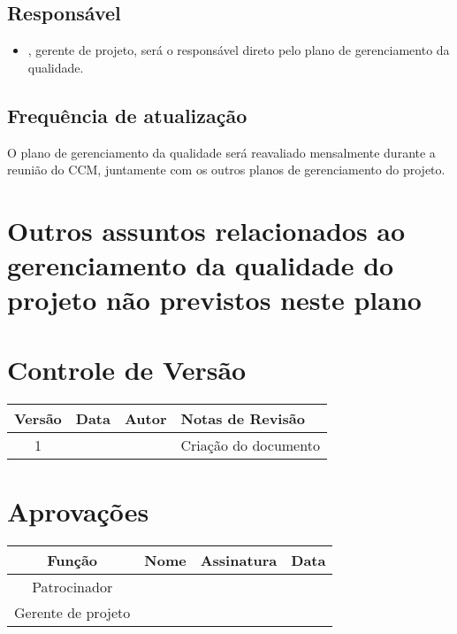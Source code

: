 \subsection{Responsável}

\begin{itemize}
	\item \projectManagerName, gerente de projeto, será o responsável direto pelo plano de gerenciamento da qualidade.
\end{itemize}

\subsection{Frequência de atualização}

O plano de gerenciamento da qualidade será reavaliado mensalmente durante a reunião do CCM, juntamente com os outros planos de gerenciamento do projeto.

\section{Outros assuntos relacionados ao gerenciamento da qualidade do projeto não previstos neste plano}

\section{Controle de Versão}

\begin{table}[H]
	\begin{tabularx}{\textwidth}{| c | c | X | X |}
		\hline
		\textbf{Versão} & \textbf{Data} & \textbf{Autor}      & \textbf{Notas de Revisão} \\
		\hline
		1                &               & \projectManagerName & Criação do documento     \\
		\hline
	\end{tabularx}
	\centering
\end{table}

\section{Aprovações}

\begin{table}[H]
	\begin{tabularx}{\textwidth}{| c | c | X | c |}
		\hline
		\textbf{Função}  & \textbf{Nome}       & \textbf{Assinatura}      & \textbf{Data} \\
		\hline
		Patrocinador       & \projectSponsorName & \projectSponsorSignature &               \\
		\hline
		Gerente de projeto & \projectManagerName & \projectManagerSignature &               \\
		\hline
	\end{tabularx}
	\centering
\end{table}